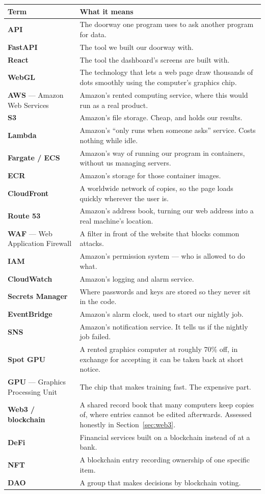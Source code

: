 \documentclass[11pt,a4paper]{article}
\begin{document}
\begin{longtable}{@{}p{4.1cm}p{11.4cm}@{}}
\toprule
\textbf{Term} & \textbf{What it means} \\
\midrule
\endhead
\textbf{API} & The doorway one program uses to ask another program for data. \\
\textbf{FastAPI} & The tool we built our doorway with. \\
\textbf{React} & The tool the dashboard's screens are built with. \\
\textbf{WebGL} & The technology that lets a web page draw thousands of dots
smoothly using the computer's graphics chip. \\
\textbf{AWS} --- Amazon Web Services & Amazon's rented computing service, where
this would run as a real product. \\
\textbf{S3} & Amazon's file storage. Cheap, and holds our results. \\
\textbf{Lambda} & Amazon's ``only runs when someone asks'' service. Costs nothing
while idle. \\
\textbf{Fargate / ECS} & Amazon's way of running our program in containers,
without us managing servers. \\
\textbf{ECR} & Amazon's storage for those container images. \\
\textbf{CloudFront} & A worldwide network of copies, so the page loads quickly
wherever the user is. \\
\textbf{Route 53} & Amazon's address book, turning our web address into a real
machine's location. \\
\textbf{WAF} --- Web Application Firewall & A filter in front of the website that
blocks common attacks. \\
\textbf{IAM} & Amazon's permission system --- who is allowed to do what. \\
\textbf{CloudWatch} & Amazon's logging and alarm service. \\
\textbf{Secrets Manager} & Where passwords and keys are stored so they never sit
in the code. \\
\textbf{EventBridge} & Amazon's alarm clock, used to start our nightly job. \\
\textbf{SNS} & Amazon's notification service. It tells us if the nightly job
failed. \\
\textbf{Spot GPU} & A rented graphics computer at roughly 70\% off, in exchange
for accepting it can be taken back at short notice. \\
\textbf{GPU} --- Graphics Processing Unit & The chip that makes training fast. The
expensive part. \\
\textbf{Web3 / blockchain} & A shared record book that many computers keep copies
of, where entries cannot be edited afterwards. Assessed honestly in
Section~\ref{sec:web3}. \\
\textbf{DeFi} & Financial services built on a blockchain instead of at a bank. \\
\textbf{NFT} & A blockchain entry recording ownership of one specific item. \\
\textbf{DAO} & A group that makes decisions by blockchain voting. \\
\bottomrule
\end{longtable}
\end{document}
